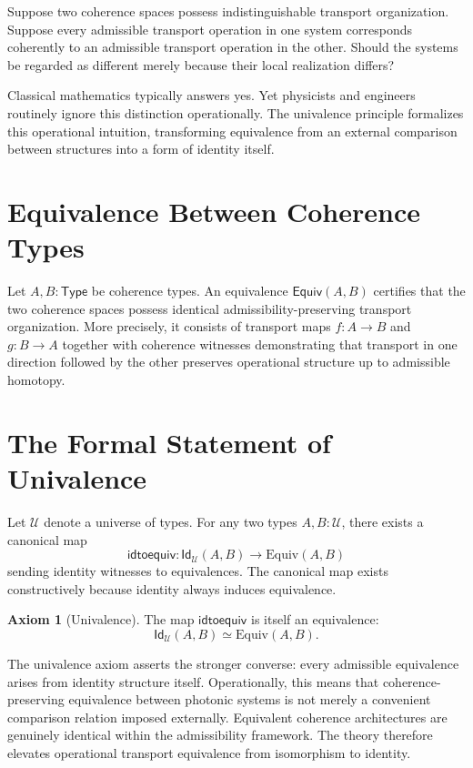 \documentclass[11pt,openany]{book}
\theoremstyle{definition}
\newtheorem{axiom}[definition]{Axiom}
\theoremstyle{plain}
\newcommand{\Type}{\mathsf{Type}}
\newcommand{\idtype}{\mathsf{Id}}
\newcommand{\Equiv}{\mathsf{Equiv}}
\begin{document}
Suppose two coherence spaces possess indistinguishable transport organization. Suppose every admissible transport operation in one system corresponds coherently to an admissible transport operation in the other. Should the systems be regarded as different merely because their local realization differs?

Classical mathematics typically answers yes. Yet physicists and engineers routinely ignore this distinction operationally. The univalence principle formalizes this operational intuition, transforming equivalence from an external comparison between structures into a form of identity itself.

\section{Equivalence Between Coherence Types}

Let $A, B : \Type$ be coherence types. An equivalence $\Equiv(A,B)$ certifies that the two coherence spaces possess identical admissibility-preserving transport organization. More precisely, it consists of transport maps $f : A \to B$ and $g : B \to A$ together with coherence witnesses demonstrating that transport in one direction followed by the other preserves operational structure up to admissible homotopy.

\section{The Formal Statement of Univalence}

Let $\mathcal{U}$ denote a universe of types. For any two types $A, B : \mathcal{U}$, there exists a canonical map
\[
\mathsf{idtoequiv} : \idtype_{\mathcal{U}}(A,B) \to \mathrm{Equiv}(A,B)
\]
sending identity witnesses to equivalences. The canonical map exists constructively because identity always induces equivalence.

\begin{axiom}[Univalence]
The map $\mathsf{idtoequiv}$ is itself an equivalence:
\[
\idtype_{\mathcal{U}}(A,B) \simeq \mathrm{Equiv}(A,B).
\]
\end{axiom}

The univalence axiom asserts the stronger converse: every admissible equivalence arises from identity structure itself. Operationally, this means that coherence-preserving equivalence between photonic systems is not merely a convenient comparison relation imposed externally. Equivalent coherence architectures are genuinely identical within the admissibility framework. The theory therefore elevates operational transport equivalence from isomorphism to identity.
\end{document}
